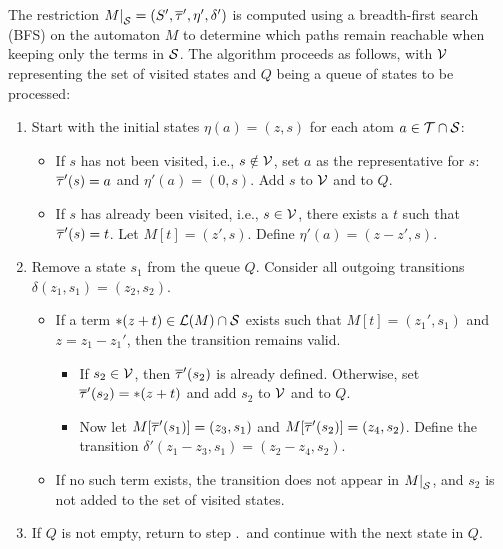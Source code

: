 The restriction $\restr{M}{\Set} = (S', \otau', \eta', \delta')$ is computed using a breadth-first search (BFS) on the automaton $M$ to determine which paths remain reachable when keeping only the terms in $\mathcal{S}$.
The algorithm proceeds as follows, with $\mathcal{V}$ representing the set of visited states and $Q$ being a queue of states to be processed:

\begin{enumerate}
    \item Start with the initial states $\eta(a) = (z, s)$ for each atom $a \in \mathcal{T} \cap \mathcal{S}$:
          \begin{itemize}
              \item If $s$ has not been visited, i.e., $s \notin \mathcal{V}$, set $a$ as the representative for $s$:
                    $\overline{\tau}'(s) = a$ and $\eta'(a) = (0, s)$.
                    Add $s$ to $\mathcal{V}$ and to $Q$.
              \item If $s$ has already been visited, i.e., $s \in \mathcal{V}$, there exists a $t$ such that $\overline{\tau}'(s) = t$.
                    Let $M[t] = (z', s)$.
                    Define $\eta'(a) = (z - z', s)$.
          \end{itemize}

          \item\label{item:remove-from-Q} Remove a state $s_1$ from the queue $Q$.
          Consider all outgoing transitions $\delta(z_1, s_1) = (z_2, s_2)$.
          \begin{itemize}
              \item If a term $*(z+t) \in \mathcal{L}(M) \cap \mathcal{S}$ exists such that $M[t] = (z_1', s_1)$ and $z = z_1 - z_1'$,
                    then the transition remains valid.
                    \begin{itemize}
                        \item If $s_2 \in \mathcal{V}$, then $\overline{\tau}'(s_2)$ is already defined.
                              Otherwise, set $\overline{\tau}'(s_2) = *(z+t)$ and add $s_2$ to $\mathcal{V}$ and to $Q$.
                        \item Now let $M[\overline{\tau}'(s_1)] = (z_3, s_1)$ and $M[\overline{\tau}'(s_2)] = (z_4, s_2)$.
                              Define the transition $\delta'(z_1 - z_3, s_1) = (z_2 - z_4, s_2)$.
                    \end{itemize}
              \item If no such term exists, the transition does not appear in $\restr{M}{\Set}$, and $s_2$ is not added to the set of visited states.
          \end{itemize}
    \item If $Q$ is not empty, return to step .\ and continue with the next state in $Q$.
\end{enumerate}


